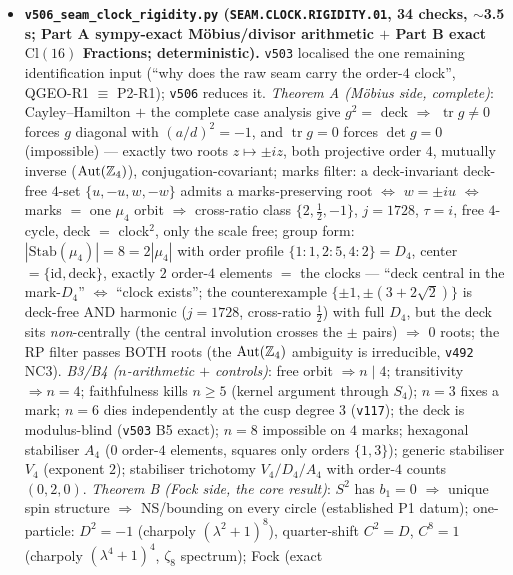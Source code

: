 \documentclass[11pt]{article}
\begin{document}
\begin{itemize}[leftmargin=1.5em]
\item \textbf{\texttt{v506\_seam\_clock\_rigidity.py} (\texttt{SEAM.CLOCK.RIGIDITY.01}, 34 checks,
$\sim$3.5 s; Part A sympy-exact M\"obius/divisor arithmetic $+$ Part B exact $\mathrm{Cl}(16)$
Fractions; deterministic).} \texttt{v503} localised the one remaining identification input (``why
does the raw seam carry the order-$4$ clock'', QGEO-R1 $\equiv$ P2-R1); \texttt{v506} reduces it.
\emph{Theorem A (M\"obius side, complete)}: Cayley--Hamilton $+$ the complete case analysis give
$g^2=$ deck $\Rightarrow$ $\operatorname{tr}g\neq0$ forces $g$ diagonal with $(a/d)^2=-1$, and
$\operatorname{tr}g=0$ forces $\det g=0$ (impossible) --- exactly two roots $z\mapsto\pm iz$, both
projective order $4$, mutually inverse ($\operatorname{Aut}(\mathbb{Z}_4)$), conjugation-covariant;
marks filter: a deck-invariant deck-free $4$-set $\{u,-u,w,-w\}$ admits a marks-preserving root
$\iff$ $w=\pm iu$ $\iff$ marks $=$ one $\mu_4$ orbit $\Rightarrow$ cross-ratio class
$\{2,\tfrac12,-1\}$, $j=1728$, $\tau=i$, free $4$-cycle, deck $=$ clock$^2$, only the scale free;
group form: $|\mathrm{Stab}(\mu_4)|=8=2|\mu_4|$ with order profile $\{1{:}1,2{:}5,4{:}2\}=D_4$,
center $=\{\mathrm{id},\text{deck}\}$, exactly $2$ order-$4$ elements $=$ the clocks --- ``deck
central in the mark-$D_4$'' $\iff$ ``clock exists''; the counterexample $\{\pm1,\pm(3{+}2\sqrt2)\}$
is deck-free AND harmonic ($j=1728$, cross-ratio $\tfrac12$) with full $D_4$, but the deck sits
\emph{non}-centrally (the central involution crosses the $\pm$ pairs) $\Rightarrow$ $0$ roots; the
RP filter passes BOTH roots (the $\operatorname{Aut}(\mathbb{Z}_4)$ ambiguity is irreducible, \texttt{v492}
NC3). \emph{B3/B4 ($n$-arithmetic $+$ controls)}: free orbit $\Rightarrow n\mid4$; transitivity
$\Rightarrow n=4$; faithfulness kills $n\ge5$ (kernel argument through $S_4$); $n=3$ fixes a mark;
$n=6$ dies independently at the cusp degree $3$ (\texttt{v117}); the deck is modulus-blind
(\texttt{v503} B5 exact); $n=8$ impossible on $4$ marks; hexagonal stabiliser $A_4$ ($0$ order-$4$
elements, squares only orders $\{1,3\}$); generic stabiliser $V_4$ (exponent $2$); stabiliser
trichotomy $V_4/D_4/A_4$ with order-$4$ counts $(0,2,0)$. \emph{Theorem B (Fock side, the core
result)}: $S^2$ has $b_1=0$ $\Rightarrow$ unique spin structure $\Rightarrow$ NS/bounding on every
circle (established P1 datum); one-particle: $D^2=-1$ (charpoly $(\lambda^2{+}1)^8$), quarter-shift
$C^2=D$, $C^8=1$ (charpoly $(\lambda^4{+}1)^4$, $\zeta_8$ spectrum); Fock (exact

\end{itemize}
\end{document}
